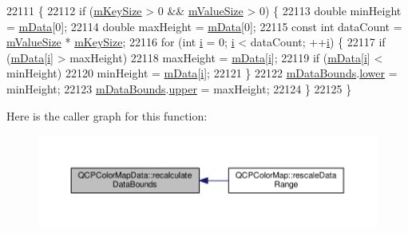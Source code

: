 \begin{DoxyCode}
22111                                             \{
22112   \textcolor{keywordflow}{if} (\hyperlink{class_q_c_p_color_map_data_a354e06462023340fbc03894b22499f6d}{mKeySize} > 0 && \hyperlink{class_q_c_p_color_map_data_ae8ee9093632a59f55eb4fc06579ed256}{mValueSize} > 0) \{
22113     \textcolor{keywordtype}{double} minHeight = \hyperlink{class_q_c_p_color_map_data_ac1682862022f575191351c9825187d39}{mData}[0];
22114     \textcolor{keywordtype}{double} maxHeight = \hyperlink{class_q_c_p_color_map_data_ac1682862022f575191351c9825187d39}{mData}[0];
22115     \textcolor{keyword}{const} \textcolor{keywordtype}{int} dataCount = \hyperlink{class_q_c_p_color_map_data_ae8ee9093632a59f55eb4fc06579ed256}{mValueSize} * \hyperlink{class_q_c_p_color_map_data_a354e06462023340fbc03894b22499f6d}{mKeySize};
22116     \textcolor{keywordflow}{for} (\textcolor{keywordtype}{int} \hyperlink{_comparision_pictures_2_createtest_image_8m_a6f6ccfcf58b31cb6412107d9d5281426}{i} = 0; \hyperlink{_comparision_pictures_2_createtest_image_8m_a6f6ccfcf58b31cb6412107d9d5281426}{i} < dataCount; ++\hyperlink{_comparision_pictures_2_createtest_image_8m_a6f6ccfcf58b31cb6412107d9d5281426}{i}) \{
22117       \textcolor{keywordflow}{if} (\hyperlink{class_q_c_p_color_map_data_ac1682862022f575191351c9825187d39}{mData}[\hyperlink{_comparision_pictures_2_createtest_image_8m_a6f6ccfcf58b31cb6412107d9d5281426}{i}] > maxHeight)
22118         maxHeight = \hyperlink{class_q_c_p_color_map_data_ac1682862022f575191351c9825187d39}{mData}[\hyperlink{_comparision_pictures_2_createtest_image_8m_a6f6ccfcf58b31cb6412107d9d5281426}{i}];
22119       \textcolor{keywordflow}{if} (\hyperlink{class_q_c_p_color_map_data_ac1682862022f575191351c9825187d39}{mData}[\hyperlink{_comparision_pictures_2_createtest_image_8m_a6f6ccfcf58b31cb6412107d9d5281426}{i}] < minHeight)
22120         minHeight = \hyperlink{class_q_c_p_color_map_data_ac1682862022f575191351c9825187d39}{mData}[\hyperlink{_comparision_pictures_2_createtest_image_8m_a6f6ccfcf58b31cb6412107d9d5281426}{i}];
22121     \}
22122     \hyperlink{class_q_c_p_color_map_data_a1798b3dcc0a27091d196bfd156dcb3f2}{mDataBounds}.\hyperlink{class_q_c_p_range_aa3aca3edb14f7ca0c85d912647b91745}{lower} = minHeight;
22123     \hyperlink{class_q_c_p_color_map_data_a1798b3dcc0a27091d196bfd156dcb3f2}{mDataBounds}.\hyperlink{class_q_c_p_range_ae44eb3aafe1d0e2ed34b499b6d2e074f}{upper} = maxHeight;
22124   \}
22125 \}
\end{DoxyCode}


Here is the caller graph for this function\+:\nopagebreak
\begin{figure}[H]
\begin{center}
\leavevmode
\includegraphics[width=350pt]{class_q_c_p_color_map_data_ab235ade8a4d64bd3adb26a99b3dd57ee_icgraph}
\end{center}
\end{figure}


